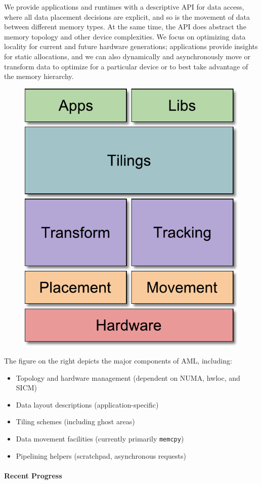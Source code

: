 We provide applications and runtimes with a descriptive API for data
access, where all data placement decisions are explicit, and so is the
movement of data between different memory types.  At the same time, the API
does abstract the memory topology and other device complexities.  We focus
on optimizing data locality for current and future hardware generations;
applications provide insights for static allocations, and we can also
dynamically and asynchronously move or transform data to optimize for a particular 
device or to best take advantage of the memory hierarchy.

\begin{figure}
\includegraphics[width=.18\textwidth]{projects/2.3.1-PMR/2.3.1.19-Argo-PowerSteering/aml-components}
\end{figure}
The figure on the right depicts the major components of AML, including:
\begin{itemize}
\item Topology and hardware management (dependent on NUMA, hwloc, and SICM)
\item Data layout descriptions (application-specific)
\item Tiling schemes (including ghost areas)
\item Data movement facilities (currently primarily \texttt{memcpy})
\item Pipelining helpers (scratchpad, asynchronous requests)
\end{itemize}

\paragraph{Recent Progress}


